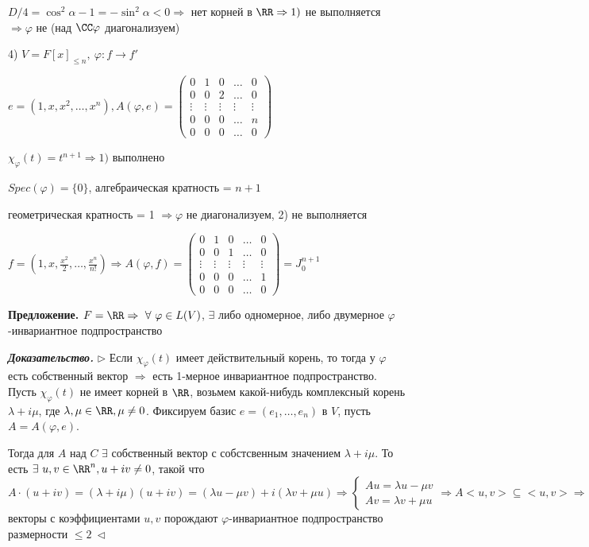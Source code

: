 $D/4 = \cos^2 \alpha - 1 = -\sin^2 \alpha < 0 \Rightarrow$ нет корней в $\RR \Rightarrow 1)$ не выполняется $\Rightarrow \varphi$ не (над $\CC \varphi$ диагонализуем) 

4) $V = F[x]_{\leq n}, \ \varphi: f \rightarrow f'$

$e = (1, x, x^2, \dots, x^n), A(\varphi, e) = \begin{pmatrix} 0 & 1 & 0 & \dots & 0 \\ 0 & 0 & 2 & \dots & 0 \\ \vdots & \vdots & \vdots & \vdots & \vdots \\ 0 & 0 & 0 & \dots & n \\ 0 & 0 & 0 & \dots & 0
\end{pmatrix}$

$\chi_{\varphi} (t) = t^{n+1} \Rightarrow 1)$ выполнено

$Spec (\varphi) = \{0\}$, алгебраическая кратность = $n + 1$

геометрическая кратность = 1 $\Rightarrow \varphi$ не диагонализуем, 2) не выполняется

$f = (1, x, \frac{x^2}{2}, \dots, \frac{x^n}{n!}) \Rightarrow A(\varphi, f) = \begin{pmatrix} 0 & 1 & 0 & \dots & 0 \\ 0 & 0 & 1 & \dots & 0 \\ \vdots & \vdots & \vdots & \vdots & \vdots \\ 0 & 0 & 0 & \dots & 1 \\ 0 & 0 & 0 & \dots & 0 \end{pmatrix} = J_0^{n+1}$

\bigskip
\textbf{Предложение.} $F = \RR \Rightarrow \ \forall \ \varphi \in L(V)$, $\exists$ либо одномерное, либо двумерное $\varphi$-инвариантное подпространство

\bigskip
\textbf{\textit{Доказательство.}} $\rhd$ Если $\chi_{\varphi} (t)$ имеет действительный корень, то тогда у $\varphi$ есть собственный вектор $\Rightarrow$ есть 1-мерное инвариантное подпространство. Пусть $\chi_{\varphi} (t)$ не имеет корней в $\RR$, возьмем какой-нибудь комплексный корень $\lambda + i \mu$, где $\lambda, \mu \in \RR, \mu \neq 0$. Фиксируем базис $e = (e_1, \dots, e_n)$ в $V$, пусть $A = A(\varphi, e)$. 

Тогда для $A$ над $C$ $\exists$ собственный вектор с собстсвенным значением $\lambda + i \mu$. То есть $\exists \ u, v \in \RR^n, u + i v \neq 0$, такой что $A \cdot (u + iv) = (\lambda + i \mu) (u + iv) = (\lambda u - \mu v) + i (\lambda v + \mu u) \Rightarrow \begin{cases}
        Au = \lambda u - \mu v \\
        Av = \lambda v + \mu u
\end{cases} \Rightarrow A <u, v> \subseteq <u, v> \Rightarrow$ векторы с коэффициентами $u, v$ порождают $\varphi$-инвариантное подпространство размерности $\leq 2 \ \lhd$

